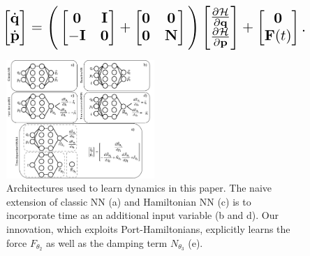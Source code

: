 \documentclass{article}
\begin{document}
\begin{equation}
\resizebox{0.9\linewidth}{!}{$%
\begin{bmatrix}
\dot{\mathbf{q}} \\
\dot{\mathbf{p}}
\end{bmatrix}
=
\Bigg(\begin{bmatrix}
\mathbf{0} & \mathbf{I} \\
-\mathbf{I} & \mathbf{0}
\end{bmatrix} +
\begin{bmatrix}
\mathbf{0} & \mathbf{0} \\
\mathbf{0} & \mathbf{N}
\end{bmatrix}
 \Bigg)
 \begin{bmatrix}
\frac{\partial \mathcal{H}}{\partial \mathbf{q}} \\
\frac{\partial \mathcal{H}}{\partial \mathbf{p}}
\end{bmatrix}
+
\begin{bmatrix}
\mathbf{0} \\
\mathbf{F}(t)
\end{bmatrix}.
$%
}%
\label{eqn.pham1}
\end{equation}
\begin{figure}[h!]
\centering
\includegraphics[width=0.5\textwidth]{figures/architecture2.pdf}
\caption{Architectures used to learn dynamics in this paper. The naive extension of classic NN (a) and Hamiltonian NN (c) is to incorporate time as an additional input variable (b and d). Our innovation, which exploits Port-Hamiltonians, explicitly learns the force $F_{\theta_2}$ as well as the damping term $N_{\theta_3}$ (e).}
\label{fig.architecture}
\end{figure}
\end{document}
